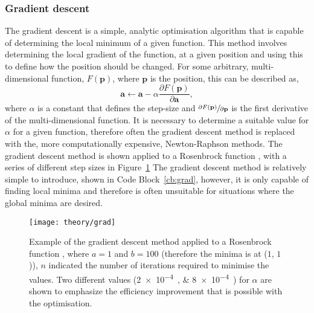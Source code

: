 \subsubsection{Gradient descent}
The gradient descent is a simple, analytic optimisation algorithm that is capable of determining the local minimum of a given function.
This method involves determining the local gradient of the function, at a given position and using this to define how the position should be changed.
For some arbitrary, multi-dimensional function, $F(\mathbf{p})$, where $\mathbf{p}$ is the position, this can be described as,
%
\begin{equation}
\mathbf{a} \leftarrow \mathbf{a} - \alpha \frac{\partial F(\mathbf{p})}{\partial \mathbf{a}},
\end{equation}
%
where $\alpha$ is a constant that defines the step-size and $\sfrac{\partial F(\mathbf{p})}{\partial \mathbf{p}}$ is the first derivative of the multi-dimensional function.
It is necessary to determine a suitable value for $\alpha$ for a given function, therefore often the gradient descent method is replaced with the, more computationally expensive, Newton-Raphson methods.
The gradient descent method is shown applied to a Rosenbrock function \cite{rosenbrock_automatic_1960}, with a series of different step sizes in Figure~\ref{fig:grad}
The gradient descent method is relatively simple to introduce, shown in Code Block~\ref{cb:grad}, however, it is only capable of finding local minima and therefore is often unsuitable for situations where the global minima are desired.
%
\begin{figure}
    \centering
    \texttt{[image: theory/grad]}
    \caption{Example of the gradient descent method applied to a Rosenbrock function \cite{rosenbrock_automatic_1960}, where $a=1$ and $b=100$ (therefore the minima is at ($1$, $1$)), $n$ indicated the number of iterations required to minimise the values. Two different values (\SIlist{2e-4;8e-4}{}) for $\alpha$ are shown to emphasize the efficiency improvement that is possible with the optimisation.}
    \label{fig:grad}
\end{figure}
%
%
\begin{figure}
    \centering
        
\end{figure}
%

